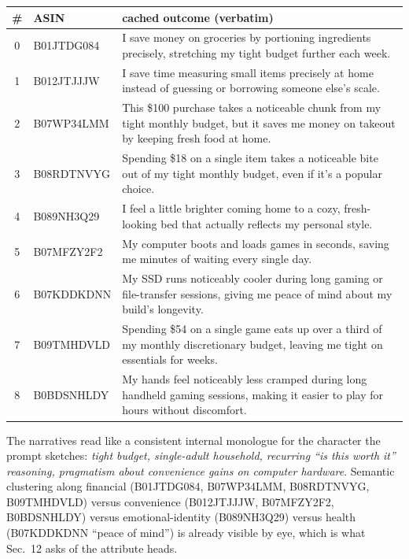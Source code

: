 \documentclass[11pt,a4paper]{article}
\begin{document}
\begin{center}\footnotesize
\begin{longtable}{@{}c l p{}@{}}
\toprule
\# & ASIN & cached outcome (verbatim) \\
\midrule\endhead
0 & B01JTDG084 & I save money on groceries by portioning ingredients precisely, stretching my tight budget further each week. \\
1 & B012JTJJJW & I save time measuring small items precisely at home instead of guessing or borrowing someone else's scale. \\
2 & B07WP34LMM & This \$100 purchase takes a noticeable chunk from my tight monthly budget, but it saves me money on takeout by keeping fresh food at home. \\
3 & B08RDTNVYG & Spending \$18 on a single item takes a noticeable bite out of my tight monthly budget, even if it's a popular choice. \\
4 & B089NH3Q29 & I feel a little brighter coming home to a cozy, fresh-looking bed that actually reflects my personal style. \\
5 & B07MFZY2F2 & My computer boots and loads games in seconds, saving me minutes of waiting every single day. \\
6 & B07KDDKDNN & My SSD runs noticeably cooler during long gaming or file-transfer sessions, giving me peace of mind about my build's longevity. \\
7 & B09TMHDVLD & Spending \$54 on a single game eats up over a third of my monthly discretionary budget, leaving me tight on essentials for weeks. \\
8 & B0BDSNHLDY & My hands feel noticeably less cramped during long handheld gaming sessions, making it easier to play for hours without discomfort. \\
\bottomrule
\end{longtable}\end{center}

The narratives read like a consistent internal monologue for the
character the prompt sketches: \emph{tight budget, single-adult
household, recurring ``is this worth it'' reasoning, pragmatism about
convenience gains on computer hardware}. Semantic clustering along
financial (B01JTDG084, B07WP34LMM, B08RDTNVYG, B09TMHDVLD) versus
convenience (B012JTJJJW, B07MFZY2F2, B0BDSNHLDY) versus
emotional-identity (B089NH3Q29) versus health (B07KDDKDNN ``peace of
mind'') is already visible by eye, which is what Sec.~12 asks of the
attribute heads.
\end{document}
